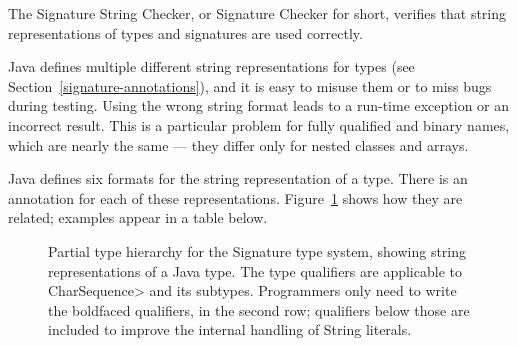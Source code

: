 \htmlhr
{}

The Signature String Checker, or Signature Checker for short, verifies that
string representations of types and signatures are used correctly.

Java defines multiple different string representations for types (see
Section~\ref{signature-annotations}), and it is easy to
misuse them or to miss bugs during testing.  Using the wrong string format
leads to a run-time exception or an incorrect result.  This is a particular
problem for fully qualified and binary names, which are nearly the same ---
they differ only for nested classes and arrays.



Java defines six formats for the string representation of a type.
There is an annotation for each of these representations.
Figure~\ref{fig-signature-hierarchy} shows how they are related;
examples appear in a table below.

\begin{figure}
\caption{Partial type hierarchy for the Signature type system, showing
  string representations of a Java type.
  The type qualifiers are applicable to \<CharSequence> and its subtypes.
  Programmers only need to write
  the boldfaced qualifiers, in the second row; qualifiers below those are
  included to improve the internal handling of String literals.}
\label{fig-signature-hierarchy}
\end{figure}

